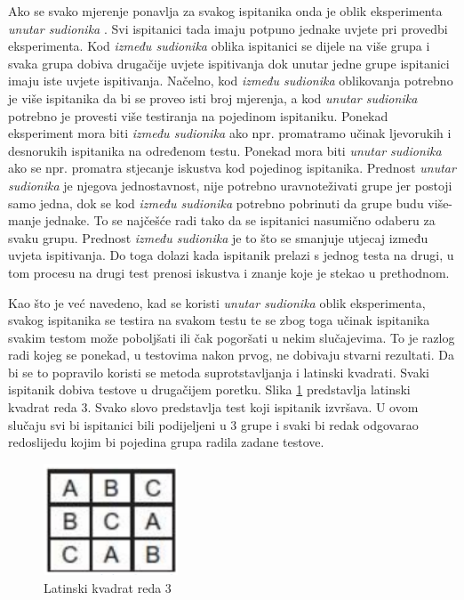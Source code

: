 \documentclass[times, utf8, zavrsni, numeric]{fer}
\begin{document}
Ako se svako mjerenje ponavlja za svakog ispitanika onda je oblik eksperimenta \emph{unutar sudionika} . Svi ispitanici tada imaju potpuno jednake uvjete pri provedbi eksperimenta. Kod \emph{između sudionika}  oblika ispitanici se dijele na više grupa i svaka grupa dobiva drugačije uvjete ispitivanja dok unutar jedne grupe ispitanici imaju iste uvjete ispitivanja. Načelno, kod \emph{između sudionika} oblikovanja potrebno je više ispitanika da bi se proveo isti broj mjerenja, a kod \emph{unutar sudionika} potrebno je provesti više testiranja na pojedinom ispitaniku. Ponekad eksperiment mora biti \emph{između sudionika} ako npr. promatramo učinak ljevorukih i desnorukih ispitanika na određenom testu. Ponekad mora biti \emph{unutar sudionika} ako se npr. promatra stjecanje iskustva kod pojedinog ispitanika. Prednost \emph{unutar sudionika} je njegova jednostavnost, nije potrebno uravnoteživati grupe jer postoji samo jedna, dok se kod \emph{između sudionika} potrebno pobrinuti da grupe budu više-manje jednake. To se najčešće radi tako da se ispitanici nasumično odaberu za svaku grupu. Prednost \emph{između sudionika} je to što se smanjuje utjecaj između uvjeta ispitivanja. Do toga dolazi kada ispitanik prelazi s jednog testa na drugi, u tom procesu na drugi test prenosi iskustva i znanje koje je stekao u prethodnom.

Kao što je već navedeno, kad se koristi \emph{unutar sudionika} oblik eksperimenta, svakog ispitanika se testira na svakom testu te se zbog toga učinak ispitanika svakim testom može poboljšati ili čak pogoršati u nekim slučajevima. To je razlog radi kojeg se ponekad, u testovima nakon prvog, ne dobivaju stvarni rezultati. Da bi se to popravilo koristi se metoda suprotstavljanja i latinski kvadrati. Svaki ispitanik dobiva testove u drugačijem poretku. Slika \ref{fig:latinski_kvadrat} predstavlja latinski kvadrat reda $3$. Svako slovo predstavlja test koji ispitanik izvršava. U ovom slučaju svi bi ispitanici bili podijeljeni u 3 grupe i svaki bi redak odgovarao redoslijedu kojim bi pojedina grupa radila zadane testove.

\begin{figure}[htb]
\centering
\includegraphics[width=4cm]{img/latinski_kvadrat.png}
\caption{Latinski kvadrat reda 3}
\label{fig:latinski_kvadrat}
\end{figure}
\end{document}
